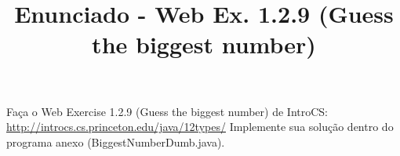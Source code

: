 \documentclass{article}
\title{Enunciado - Web Ex. 1.2.9 (Guess the biggest number)}
\date{}
\author{}
\begin{document}
\maketitle

Fa\c{c}a o Web Exercise 1.2.9 (Guess the biggest number) de IntroCS:
\bigbreak
\url{http://introcs.cs.princeton.edu/java/12types/}
\bigbreak
Implemente sua solu\c{c}\~ao dentro do programa anexo (BiggestNumberDumb.java).
\end{document}
